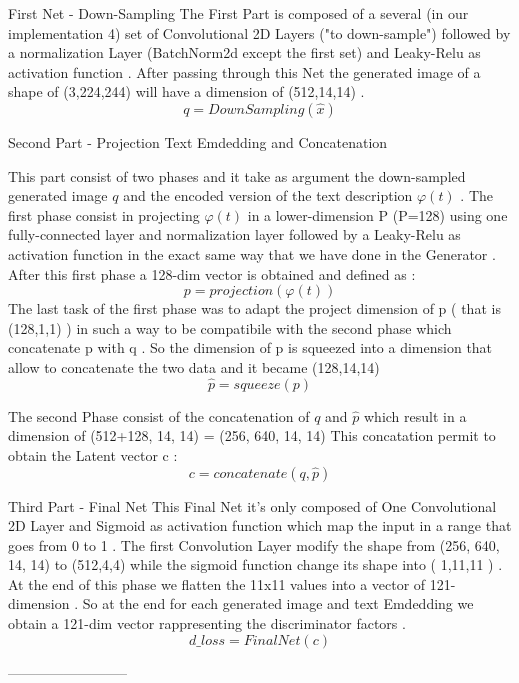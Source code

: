 First Net - Down-Sampling 
The First Part is composed of a several (in our implementation 4) set 
of Convolutional 2D Layers ("to down-sample") 
followed by a normalization Layer (BatchNorm2d except the first set)
and Leaky-Relu as activation function . 
After passing through this Net the generated image of a shape of (3,224,244)
will have a dimension of (512,14,14) .
\[
 q = DownSampling( \hat{x} )
\]

Second Part - Projection Text Emdedding and Concatenation

This part consist of two phases and it take as argument the down-sampled generated 
image ${q}$ and the encoded version of the text description $\varphi(t)$ .
The first phase consist in projecting $\varphi(t)$
in a lower-dimension P (P=128) using one fully-connected layer and normalization layer 
followed by a Leaky-Relu as activation function in the exact same way that we have done in 
the Generator .
After this first phase a 128-dim vector is obtained and defined as :
\[
 p = projection( \varphi(t) )
\]
The last task of the first phase was to adapt the project dimension of p 
( that is (128,1,1) ) in such a way to be compatibile with the second phase 
which concatenate p with q . 
So the dimension of p is squeezed into a dimension that allow to concatenate
the two data and it became (128,14,14)
\[
 \hat{p} = squeeze( p )
\]

The second Phase consist of the concatenation of $q$ and $\hat{p}$ 
which result in a dimension of (512+128, 14, 14) = (256, 640, 14, 14)
This concatation permit to obtain the Latent vector c :
\[
 c = concatenate( q , \hat{p} )
\]


Third Part - Final Net 
This Final Net it's only composed of One Convolutional 2D Layer and 
Sigmoid as activation function which map the input in a range that goes 
from 0 to 1 .
The first Convolution Layer modify the shape from (256, 640, 14, 14) 
to (512,4,4) while the sigmoid function change its shape into
( 1,11,11 ) .
At the end of this phase we flatten the 11x11 values into a vector of 
121-dimension .
So at the end for each generated image and text Emdedding we obtain a 
121-dim vector rappresenting the discriminator factors .
\[
 d\_loss = FinalNet( c )
\]

--------------------------
